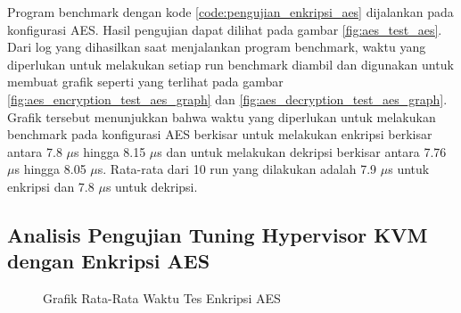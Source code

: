 Program benchmark dengan kode \ref{code:pengujian_enkripsi_aes} dijalankan pada konfigurasi AES. Hasil pengujian dapat dilihat pada gambar \ref{fig:aes_test_aes}. Dari log yang dihasilkan saat menjalankan program benchmark, waktu yang diperlukan untuk melakukan setiap run benchmark diambil dan digunakan untuk membuat grafik seperti yang terlihat pada gambar \ref{fig:aes_encryption_test_aes_graph} dan \ref{fig:aes_decryption_test_aes_graph}. Grafik tersebut menunjukkan bahwa waktu yang diperlukan untuk melakukan benchmark pada konfigurasi AES berkisar untuk melakukan enkripsi berkisar antara 7.8 $\mu$s hingga 8.15 $\mu$s dan untuk melakukan dekripsi berkisar antara 7.76 $\mu$s hingga 8.05 $\mu$s. Rata-rata dari 10 run yang dilakukan adalah 7.9 $\mu$s untuk enkripsi dan 7.8 $\mu$s untuk dekripsi.

\subsection{Analisis Pengujian Tuning Hypervisor KVM dengan Enkripsi AES}

\begin{figure}
    \centering
    \caption{Grafik Rata-Rata Waktu Tes Enkripsi AES}
    \label{fig:aes_encrypt_test_graph}
\end{figure}

